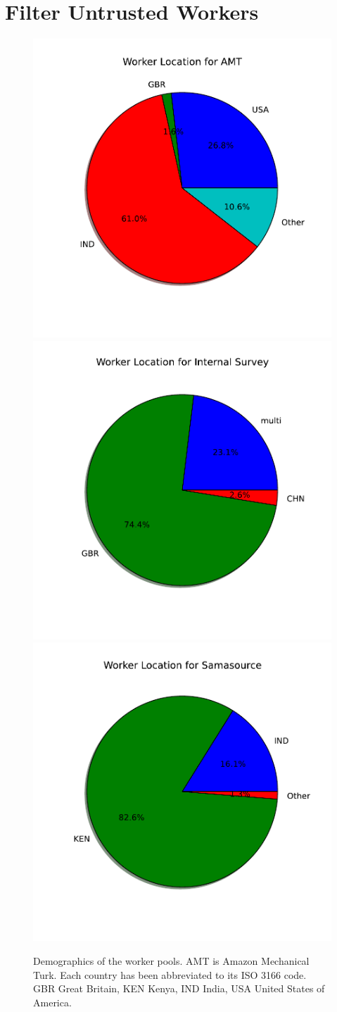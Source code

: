 \section{Filter Untrusted Workers}
\label{SectionNeedToFilter}


\begin{figure}
\centering
\includegraphics[width = 0.32 \columnwidth]{annotation/demog-amt.pdf}
\includegraphics[width = 0.32 \columnwidth]{annotation/demog-internal.pdf}
\includegraphics[width = 0.32 \columnwidth]{annotation/demog-sama.pdf}
\caption{Demographics of the worker pools. AMT is Amazon Mechanical Turk. Each country has been abbreviated to its ISO 3166 code. GBR Great Britain, KEN Kenya, IND India, USA United States of America.}
\label{FigureCrowdDemographics}
\end{figure}

